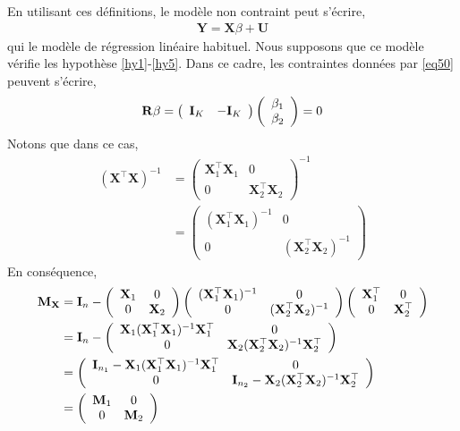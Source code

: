 En utilisant ces définitions, le modèle non contraint peut s'écrire,
\begin{align}
\mathbf{Y} = \mathbf{X}\beta + \mathbf{U}
\label{eq51}
\end{align}
qui le modèle de régression linéaire habituel. Nous supposons que ce modèle vérifie les hypothèse \ref{hy1}-\ref{hy5}. Dans ce cadre, les contraintes données par \eqref{eq50} peuvent s'écrire,
\begin{align*}
\mathbf{R}\beta =
\left(\begin{array}{cc}
\mathbf{I}_K&-\mathbf{I}_K
\end{array}
\right)
\left(
\begin{array}{c}
\beta_1\\
\beta_2
\end{array}
\right)
=0
\end{align*}
Notons que dans ce cas,
\begin{align*}
(\mathbf{X}^\top\mathbf{X})^{-1} &=
\left(
\begin{array}{cc}
\mathbf{X}_1^\top\mathbf{X}_1 &0\\
0&\mathbf{X}_2^\top\mathbf{X}_2
\end{array}
\right) ^{-1}\\
&=
\left(
\begin{array}{cc}
(\mathbf{X}_1^\top\mathbf{X}_1)^{-1} &0\\
0&(\mathbf{X}_2^\top\mathbf{X}_2)^{-1}
\end{array}
\right) 
\end{align*}
En conséquence,
\begin{align*}
\mathbf{M}_\mathbf{X}&=\mathbf{I}_n 
- 
\left(
\begin{array}{cc}
\mathbf{X}_1&0\\
0&\mathbf{X}_2
\end{array}
\right)
\left(
\begin{array}{cc}
(\mathbf{X}_1^\top\mathbf{X}_1)^{-1} &0\\
0&(\mathbf{X}_2^\top\mathbf{X}_2)^{-1}
\end{array}
\right) 
\left(
\begin{array}{cc}
\mathbf{X}_1^\top&0\\
0&\mathbf{X}_2^\top
\end{array}
\right)
\\
&=\mathbf{I}_n - \left(
\begin{array}{cc}
\mathbf{X}_1(\mathbf{X}_1^\top\mathbf{X}_1)^{-1}\mathbf{X}_1^\top &0\\
0&\mathbf{X}_2(\mathbf{X}_2^\top\mathbf{X}_2)^{-1}\mathbf{X}_2^\top
\end{array}
\right) 
\\
&= 
\left(
\begin{array}{cc}
\mathbf{I}_{n_1} - \mathbf{X}_1(\mathbf{X}_1^\top\mathbf{X}_1)^{-1}\mathbf{X}_1^\top &0\\
0&\mathbf{I}_{n_2} - \mathbf{X}_2(\mathbf{X}_2^\top\mathbf{X}_2)^{-1}\mathbf{X}_2^\top
\end{array}
\right) \\
&= \left(
\begin{array}{cc}
\mathbf{M}_1&0\\
0&\mathbf{M}_2
\end{array}
\right)
\end{align*}
